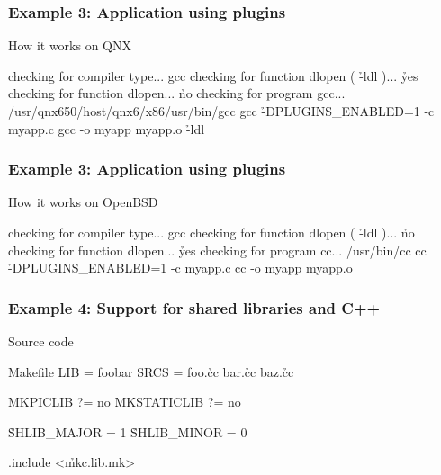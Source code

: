 \documentclass[hyperref={colorlinks=true}]{beamer}
\begin{document}
\begin{frame}[fragile]
  \frametitle{Example 3: Application using plugins}

  \begin{block}{How it works on QNX}
\begin{CodeNoLabel}
checking for compiler type... gcc
checking for function dlopen ( \h{-ldl} )... \h{yes}
checking for function dlopen... \h{no}
checking for program gcc...
      /usr/qnx650/host/qnx6/x86/usr/bin/gcc
gcc \h{-DPLUGINS\_ENABLED=1}    -c myapp.c
gcc -o myapp myapp.o \h{-ldl}
\prompt{\$}
\end{CodeNoLabel}
  \end{block}
\end{frame}

\begin{frame}[fragile]
  \frametitle{Example 3: Application using plugins}

  \begin{block}{How it works on OpenBSD}
\begin{CodeNoLabel}
checking for compiler type... gcc
checking for function dlopen ( \h{-ldl} )... \h{no}
checking for function dlopen... \h{yes}
checking for program cc... /usr/bin/cc
cc \h{-DPLUGINS\_ENABLED=1}    -c myapp.c
cc -o myapp myapp.o
\prompt{\$}
\end{CodeNoLabel}
  \end{block}
\end{frame}

\begin{frame}[fragile]
  \frametitle{Example 4: Support for shared libraries and C++}

  \begin{block}{Source code}
  \begin{Code}{Makefile}
LIB =                   foobar
SRCS =                  foo.\h{cc} bar.\h{cc} baz.\h{cc}

MKPICLIB ?=             no
MKSTATICLIB ?=          no

\h{SHLIB\_MAJOR} =           1
\h{SHLIB\_MINOR} =           0

.include <\h{mkc.lib.mk}>
  \end{Code}
  \end{block}
\end{frame}
\end{document}
